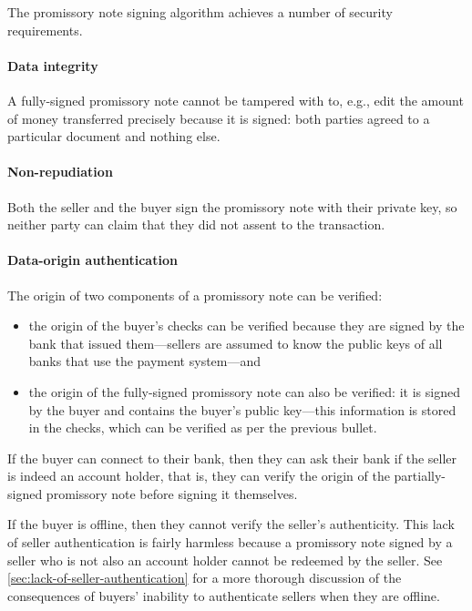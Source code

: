 \documentclass[12pt,a4paper]{article}
\begin{document}
\begin{multicols}{2}
	The promissory note signing algorithm achieves a number of security requirements.
	
	\paragraph{Data integrity}

	A fully-signed promissory note cannot be tampered with to, e.g., edit the amount of money transferred precisely because it is signed: both parties agreed to a particular document and nothing else.

	\paragraph{Non-repudiation}
	
	Both the seller and the buyer sign the promissory note with their private key, so neither party can claim that they did not assent to the transaction.
	
	\paragraph{Data-origin authentication}
	
	The origin of two components of a promissory note can be verified:
	
	\begin{itemize}
		\item the origin of the buyer's checks can be verified because they are signed by the bank that issued them---sellers are assumed to know the public keys of all banks that use the payment system---and
	
		\item the origin of the fully-signed promissory note can also be verified: it is signed by the buyer and contains the buyer's public key---this information is stored in the checks, which can be verified as per the previous bullet.
	\end{itemize}

	If the buyer can connect to their bank, then they can ask their bank if the seller is indeed an account holder, that is, they can verify the origin of the partially-signed promissory note before signing it themselves.
	
	If the buyer is offline, then they cannot verify the seller's authenticity. This lack of seller authentication is fairly harmless because a promissory note signed by a seller who is not also an account holder cannot be redeemed by the seller. See \autoref{sec:lack-of-seller-authentication} for a more thorough discussion of the consequences of buyers' inability to authenticate sellers when they are offline.


\end{multicols}
\end{document}
